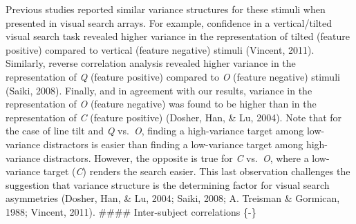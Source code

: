 \documentclass[12pt,twoside]{reedthesis}
\begin{document}
Previous studies reported similar variance structures for these stimuli when presented in visual search arrays. For example, confidence in a vertical/tilted visual search task revealed higher variance in the representation of tilted (feature positive) compared to vertical (feature negative) stimuli (Vincent, 2011). Similarly, reverse correlation analysis revealed higher variance in the representation of \emph{Q} (feature positive) compared to \emph{O} (feature negative) stimuli (Saiki, 2008). Finally, and in agreement with our results, variance in the representation of \emph{O} (feature negative) was found to be higher than in the representation of \emph{C} (feature positive) (Dosher, Han, \& Lu, 2004). Note that for the case of line tilt and \emph{Q} vs.~\emph{O}, finding a high-variance target among low-variance distractors is easier than finding a low-variance target among high-variance distractors. However, the opposite is true for \emph{C} vs.~\emph{O}, where a low-variance target (\emph{C}) renders the search easier. This last observation challenges the suggestion that variance structure is the determining factor for visual search asymmetries (Dosher, Han, \& Lu, 2004; Saiki, 2008; A. Treisman \& Gormican, 1988; Vincent, 2011).
\#\#\#\# Inter-subject correlations \{-\}
\end{document}
